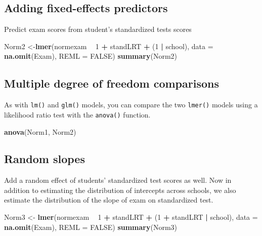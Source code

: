 \documentclass[]{book}
\newenvironment{Shaded}{\begin{snugshade}}{\end{snugshade}}
\newcommand{\KeywordTok}[1]{\textcolor[rgb]{0.13,0.29,0.53}{\textbf{#1}}}
\newcommand{\DataTypeTok}[1]{\textcolor[rgb]{0.13,0.29,0.53}{#1}}
\newcommand{\DecValTok}[1]{\textcolor[rgb]{0.00,0.00,0.81}{#1}}
\newcommand{\StringTok}[1]{\textcolor[rgb]{0.31,0.60,0.02}{#1}}
\newcommand{\OtherTok}[1]{\textcolor[rgb]{0.56,0.35,0.01}{#1}}
\newcommand{\OperatorTok}[1]{\textcolor[rgb]{0.81,0.36,0.00}{\textbf{#1}}}
\newcommand{\NormalTok}[1]{#1}
\begin{document}
\subsection{Adding fixed-effects
predictors}\label{adding-fixed-effects-predictors}

Predict exam scores from student's standardized tests scores

\begin{Shaded}
\begin{Highlighting}[]
\NormalTok{  Norm2 <-}\KeywordTok{lmer}\NormalTok{(normexam }\OperatorTok{~}\StringTok{ }\DecValTok{1} \OperatorTok{+}\StringTok{ }\NormalTok{standLRT }\OperatorTok{+}\StringTok{ }\NormalTok{(}\DecValTok{1} \OperatorTok{|}\StringTok{ }\NormalTok{school),}
               \DataTypeTok{data =} \KeywordTok{na.omit}\NormalTok{(Exam), }\DataTypeTok{REML =} \OtherTok{FALSE}\NormalTok{) }
  \KeywordTok{summary}\NormalTok{(Norm2) }
\end{Highlighting}
\end{Shaded}

\subsection{Multiple degree of freedom
comparisons}\label{multiple-degree-of-freedom-comparisons}

As with \texttt{lm()} and \texttt{glm()} models, you can compare the two
\texttt{lmer()} models using a likelihood ratio test with the
\texttt{anova()} function.

\begin{Shaded}
\begin{Highlighting}[]
  \KeywordTok{anova}\NormalTok{(Norm1, Norm2)}
\end{Highlighting}
\end{Shaded}

\subsection{Random slopes}\label{random-slopes}

Add a random effect of students' standardized test scores as well. Now
in addition to estimating the distribution of intercepts across schools,
we also estimate the distribution of the slope of exam on standardized
test.

\begin{Shaded}
\begin{Highlighting}[]
\NormalTok{  Norm3 <-}\StringTok{ }\KeywordTok{lmer}\NormalTok{(normexam }\OperatorTok{~}\StringTok{ }\DecValTok{1} \OperatorTok{+}\StringTok{ }\NormalTok{standLRT }\OperatorTok{+}\StringTok{ }\NormalTok{(}\DecValTok{1} \OperatorTok{+}\StringTok{ }\NormalTok{standLRT }\OperatorTok{|}\StringTok{ }\NormalTok{school), }
                \DataTypeTok{data =} \KeywordTok{na.omit}\NormalTok{(Exam), }\DataTypeTok{REML =} \OtherTok{FALSE}\NormalTok{) }
  \KeywordTok{summary}\NormalTok{(Norm3) }
\end{Highlighting}
\end{Shaded}
\end{document}
